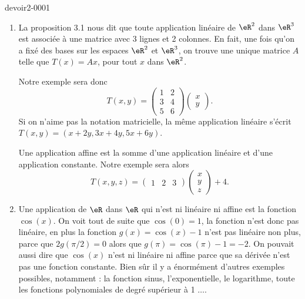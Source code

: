 \begin{corrige}{devoir2-0001}
  
  \begin{enumerate}

  \item La proposition 3.1 nous dit que toute application linéaire de $\eR^2$ dans $\eR^3$ est associée à une matrice avec 3 lignes et 2 colonnes. En fait, une fois qu'on a fixé des bases sur les espaces  $\eR^2$ et $\eR^3$, on trouve une unique matrice $A$ telle que $T(x)=Ax$, pour tout $x$ dans $\eR^2$.

 Notre exemple sera donc 
 \begin{equation}
   T(x,y)= \begin{pmatrix}
     1 &  2\\
     3 & 4 \\
     5 & 6
   \end{pmatrix}
   \begin{pmatrix}
     x\\
     y
   \end{pmatrix}.
 \end{equation}
Si on n'aime pas la notation matricielle, la même application linéaire s'écrit $T(x,y)= (x+2y, 3x+4y, 5x+6y)$.

 
 Une application affine est la somme d'une application linéaire et d'une application constante. Notre exemple sera alors 
 \begin{equation}
   T(x,y,z)= 
   \begin{pmatrix}
     1&2&3
   \end{pmatrix}
   \begin{pmatrix}
     x\\
     y\\
     z
   \end{pmatrix}+ 4.
 \end{equation}
  \item Une application de $\eR$ dans $\eR$ qui n'est ni linéaire ni affine est la fonction $\cos (x)$. On voit tout de suite que $\cos(0)=1$, la fonction n'est donc pas linéaire, en plus la fonction $g(x)=\cos(x)-1$ n'est pas linéaire non plus, parce que $2g(\pi/2)= 0$ alors que $g(\pi)= \cos(\pi)-1=-2$. On pouvait aussi dire que $\cos(x)$ n'est ni linéaire ni affine parce que sa dérivée n'est pas une fonction constante. Bien sûr il y a énormément d'autres exemples possibles, notamment : la fonction sinus, l'exponentielle, le logarithme, toute les fonctions polynomiales de degré supérieur à 1 $\ldots$.
  \end{enumerate}
\end{corrige}
